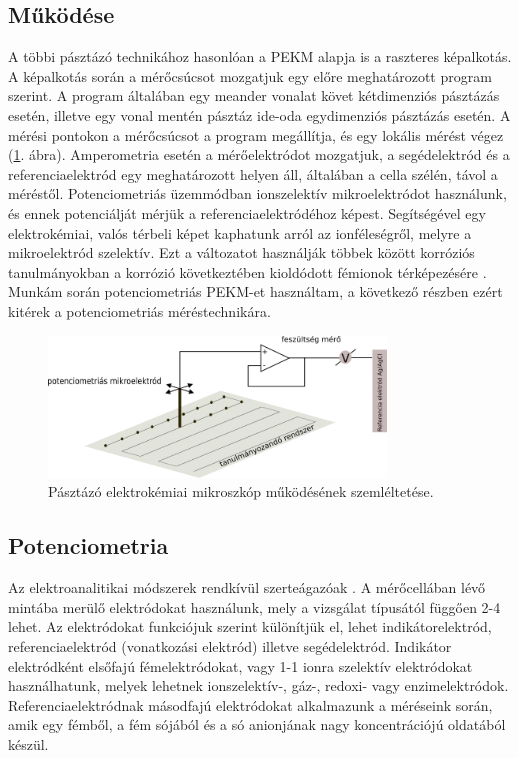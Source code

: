 \subsection{Működése}

A többi pásztázó technikához hasonlóan a PEKM alapja is a raszteres képalkotás. A képalkotás során a mérőcsúcsot mozgatjuk egy előre meghatározott program szerint. A program általában egy meander vonalat követ kétdimenziós pásztázás esetén, illetve egy vonal mentén pásztáz ide-oda egydimenziós pásztázás esetén. A mérési pontokon a mérőcsúcsot a program megállítja, és egy lokális mérést végez (\ref{fig:PEKM}. ábra). Amperometria esetén a mérőelektródot mozgatjuk, a segédelektród és a referenciaelektród egy meghatározott helyen áll, általában a cella szélén, távol a méréstől. Potenciometriás üzemmódban ionszelektív mikroelektródot használunk, és ennek potenciálját mérjük a referenciaelektródéhoz képest. Segítségével egy elektrokémiai, valós térbeli képet kaphatunk arról az ionféleségről, melyre a mikroelektród szelektív. Ezt a változatot használják többek között korróziós tanulmányokban a korrózió következtében kioldódott fémionok térképezésére \cite{bastos2010micropotentiometric, lamaka2008monitoring, karavai2010localized}. Munkám során potenciometriás PEKM-et használtam, a következő részben ezért kitérek a potenciometriás méréstechnikára.
\begin{figure}
\centering
\includegraphics[width=0.8\textwidth]{img/PEKM.png}
\caption{Pásztázó elektrokémiai mikroszkóp működésének szemléltetése.}
\label{fig:PEKM}
\end{figure}


\subsection{Potenciometria} 

Az elektroanalitikai módszerek rendkívül szerteágazóak \cite{erdey1967, pfreisich1960, kissl1997}. A mérőcellában lévő mintába merülő elektródokat használunk, mely a vizsgálat típusától függően 2-4 lehet. Az elektródokat funkciójuk szerint különítjük el, lehet indikátorelektród, referenciaelektród (vonatkozási elektród) illetve segédelektród. Indikátor elektródként elsőfajú fémelektródokat, vagy 1-1 ionra szelektív elektródokat használhatunk, melyek lehetnek ionszelektív-, gáz-, redoxi- vagy enzimelektródok. Referenciaelektródnak másodfajú elektródokat alkalmazunk a méréseink során, amik egy fémből, a fém sójából és a só anionjának nagy koncentrációjú oldatából készül.


